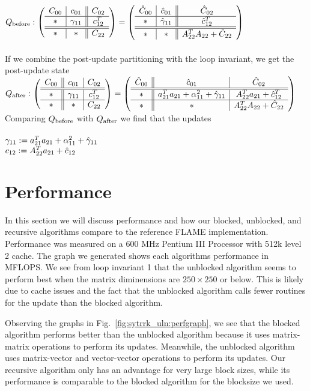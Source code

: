 $
Q_{\rm before}:
\left( \begin{array}{c | c || c}  C_{00}  &  c_{01}  &  C_{02}  \\ \hline  *  &  \gamma_{11}  &  c_{12}^T  \\ \hline \hline  *  &  *  &  C_{22}  \end{array} \right)
=
\left( \begin{array}{c | c || c}  \hat{C}_{00}  &  \hat{c}_{01}  &  \hat{C}_{02}  \\ \hline  *  &  \hat{\gamma}_{11}  &  \hat{c}_{12}^T  \\ \hline \hline  *  &  *  &  A_{22}^T A_{22} + \hat{C}_{22}  \end{array} \right)
$
\\
\\
If we combine the post-update partitioning with the loop invariant, we get the post-update state %
\\
$\\
Q_{\rm after}:
\left( \begin{array}{c || c | c}  C_{00}  &  c_{01}  &  C_{02}  \\ \hline \hline  *  &  \gamma_{11}  &  c_{12}^T  \\ \hline  *  &  *  &  C_{22}  \end{array} \right)
=
\left( \begin{array}{c || c | c}  \hat{C}_{00}  &  \hat{c}_{01}  &  \hat{C}_{02}  \\ \hline \hline  *  &  a_{21}^T a_{21} + \alpha_{11}^2 + \hat{\gamma}_{11}  &  A_{22}^T a_{21} + \hat{c}_{12}^T  \\ \hline  *  &  *  &  A_{22}^T A_{22} + \hat{C}_{22}  \end{array} \right)
$
\\
Comparing $Q_{\rm before}$ with $Q_{\rm after}$ we find that the updates
\\
\\
$\gamma_{11} := a_{21}^T a_{21} + \alpha_{11}^2 + \hat{\gamma}_{11}$ \\
$c_{12} := A_{22}^T a_{21} + \hat{c}_{12}$
\\

\section{Performance}


In this section we will discuss performance and how our blocked, unblocked, and recursive algorithms compare to
the reference FLAME implementation. Performance was measured on a 600 MHz Pentium III Processor with 512k level 2 cache.
The graph we generated shows each algorithms performance in MFLOPS. We see from loop invariant 1 that the unblocked
algorithm seems to perform best when the matrix diminensions are $ 250 \times 250 $ or below.
This is likely due to cache issues and the fact that the unblocked algorithm calls fewer routines for the update
than the blocked algorithm.

Observing the graphs in Fig.~\ref{fig:sytrrk_uln:perfgraph}, we see that the blocked algorithm performs better than
the unblocked algorithm because it uses matrix-matrix operations to perform its updates. Meanwhile, the unblocked
algorithm uses matrix-vector and vector-vector operations to perform its updates. Our recursive algorithm only has
an advantage for very large block sizes, while its performance is comparable to the blocked algorithm for the
blocksize we used.


